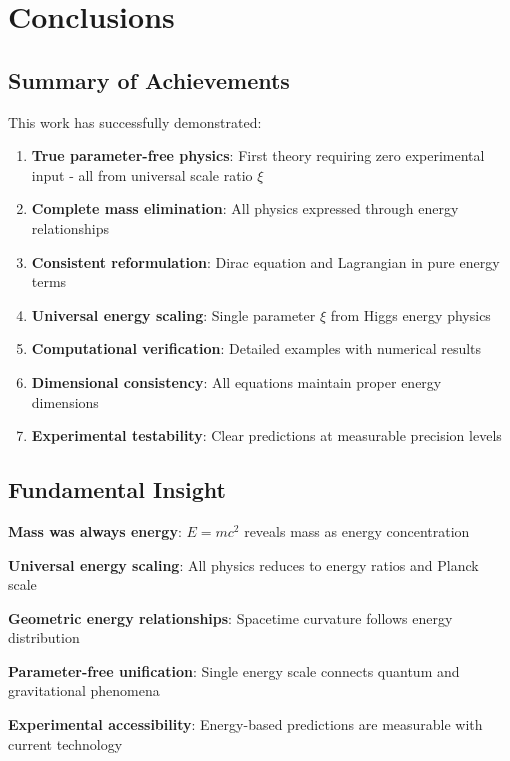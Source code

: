 \documentclass[12pt,a4paper]{article}
\begin{document}
	\section{Conclusions}
	\label{sec:conclusions}
	
	\subsection{Summary of Achievements}
	\label{subsec:summary_achievements}
	
	This work has successfully demonstrated:
	
	\begin{enumerate}
		\item \textbf{True parameter-free physics}: First theory requiring zero experimental input - all from universal scale ratio $\xi$
		\item \textbf{Complete mass elimination}: All physics expressed through energy relationships
		\item \textbf{Consistent reformulation}: Dirac equation and Lagrangian in pure energy terms
		\item \textbf{Universal energy scaling}: Single parameter $\xi$ from Higgs energy physics
		\item \textbf{Computational verification}: Detailed examples with numerical results
		\item \textbf{Dimensional consistency}: All equations maintain proper energy dimensions
		\item \textbf{Experimental testability}: Clear predictions at measurable precision levels
	\end{enumerate}
	
	\subsection{Fundamental Insight}
	\label{subsec:fundamental_insight_conclusion}
	
	\begin{tcolorbox}[colback=green!5!white,colframe=green!75!black,title=The Pure Energy Paradigm]
		\textbf{Mass was always energy}: $E = mc^2$ reveals mass as energy concentration
		
		\textbf{Universal energy scaling}: All physics reduces to energy ratios and Planck scale
		
		\textbf{Geometric energy relationships}: Spacetime curvature follows energy distribution
		
		\textbf{Parameter-free unification}: Single energy scale connects quantum and gravitational phenomena
		
		\textbf{Experimental accessibility}: Energy-based predictions are measurable with current technology
	\end{tcolorbox}
	
\end{document}
